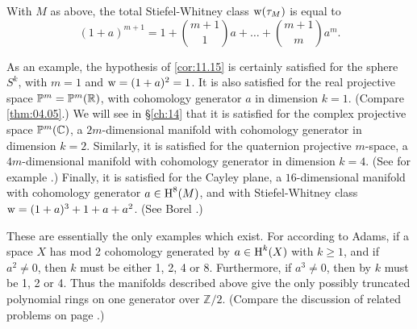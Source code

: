\documentclass[../main]{subfiles}
\begin{document}
\begin{corollary} \label{cor:11.15}
With $M$ as above, the total Stiefel-Whitney class $\operatorname{w}(\tau_M)$ is equal to
\[
(1+a)^{m+1}
=
1
+
\binom{m+1}{1}a
+
\hdots
+
\binom{m+1}{m}a^m.
\]
\end{corollary}

As an example, the hypothesis of \ref{cor:11.15} is certainly satisfied for the sphere $S^k$, with $m=1$ and $\operatorname{w}=(1+a)^2=1$. It is also satisfied for the real projective space $\mathbb{P}^m=\mathbb{P}^m(\mathbb R)$, with cohomology generator $a$ in dimension $k=1$. (Compare \ref{thm:04.05}.) We will see in \S\ref{ch:14} that it is satisfied for the complex projective space $\mathbb{P}^m(\mathbb C)$, a $2m$-dimensional manifold with cohomology generator in dimension $k=2$. Similarly, it is satisfied for the quaternion projective $m$-space, a $4m$-dimensional manifold with cohomology generator in dimension $k=4$. (See for example \cite{spanier1981}.) Finally, it is satisfied for the Cayley plane, a $16$-dimensional manifold with cohomology generator $a\in \operatorname{H}^8(M)$, and with Stiefel-Whitney class $\operatorname{w} =(1+a)^3+1+a+a^2$. (See Borel  \cite{borel1950}.)

These are essentially the only examples which exist. For according to Adams\cite{adams1960}, if a space $X$ has mod 2 cohomology generated by $a\in \operatorname{H}^k(X)$ with $k\geq 1$, and if $a^2 \neq 0$, then $k$ must be either 1, 2, 4 or 8. Furthermore, if $a^3\neq 0$, then by \cite{adem} $k$ must be 1, 2 or 4. Thus the manifolds described above give the only possibly truncated polynomial rings on one generator over $\mathbb Z/2$. (Compare the discussion of related problems on page \pageref{problems page 47}.)
\end{document}
